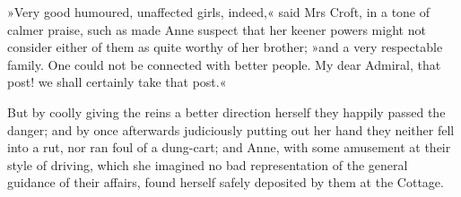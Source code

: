 »Very good humoured, unaffected girls, indeed,« said Mrs Croft, in a tone of calmer praise, such as made Anne suspect that her keener powers might not consider either of them as quite worthy of her brother; »and a very respectable family. One could not be connected with better people. My dear Admiral, that post! we shall certainly take that post.«

But by coolly giving the reins a better direction herself they happily passed the danger; and by once afterwards judiciously putting out her hand they neither fell into a rut, nor ran foul of a dung-cart; and Anne, with some amusement at their style of driving, which she imagined no bad representation of the general guidance of their affairs, found herself safely deposited by them at the Cottage.